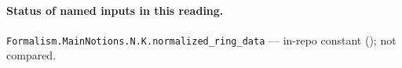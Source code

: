 

\paragraph{Status of named inputs in this reading.}
\noindent\nolinkurl{Formalism.MainNotions.N.K.normalized_ring_data} --- in-repo constant (); not compared.\par

